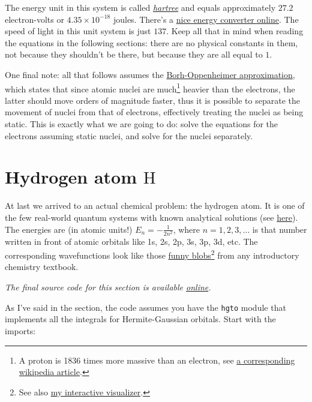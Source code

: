 \documentclass{article}
\newcommand{\molecule}[1]{\textrm{#1}}
\newcommand{\githubrepo}{https://github.com/lisyarus/chembook}
\newcommand{\codeonline}[1]{\textit{The final source code for this section is available \href{\githubrepo/blob/master/code/#1}{online}.}}
\begin{document}
The energy unit in this system is called \href{https://en.wikipedia.org/wiki/Hartree}{\textit{hartree}} and equals approximately \(27.2\) electron-volts or \(4.35\times 10^{-18}\) joules. There's a \href{http://www.colby.edu/chemistry/PChem/Hartree.html}{nice energy converter online}. The speed of light in this unit system is just \(137\). Keep all that in mind when reading the equations in the following sections: there are no physical constants in them, not because they shouldn't be there, but because they are all equal to \(1\).

One final note: all that follows assumes the \href{https://en.wikipedia.org/wiki/Born%E2%80%93Oppenheimer_approximation}{Borh-Oppenheimer approximation}, which states that since atomic nuclei are much\footnote{A proton is 1836 times more massive than an electron, see \href{https://en.wikipedia.org/wiki/Proton-to-electron_mass_ratio}{a corresponding wikipedia article}.} heavier than the electrons, the latter should move orders of magnitude faster, thus it is possible to separate the movement of nuclei from that of electrons, effectively treating the nuclei as being static. This is exactly what we are going to do: solve the equations for the electrons assuming static nuclei, and solve for the nuclei separately.

\newpage

\section{Hydrogen atom \(\molecule{H}\)}

At last we arrived to an actual chemical problem: the hydrogen atom. It is one of the few real-world quantum systems with known analytical solutions (see \href{https://en.wikipedia.org/wiki/Hydrogen-like_atom}{here}). The energies are (in atomic units!) \(E_n = -\frac{1}{2n^2}\), where \(n=1,2,3,\dots\) is that number written in front of atomic orbitals like 1s, 2s, 2p, 3s, 3p, 3d, etc. The corresponding wavefunctions look like those \href{https://en.wikipedia.org/wiki/Atomic_orbital}{funny blobs}\footnote{See also \href{https://lisyarus.github.io/webgl/gto.html}{my interactive visualizer}.} from any introductory chemistry textbook.

\codeonline{hydrogen-s.py}

As I've said in the  section, the code assumes you have the \texttt{hgto} module that implements all the integrals for Hermite-Gaussian orbitals. Start with the imports:
\end{document}
